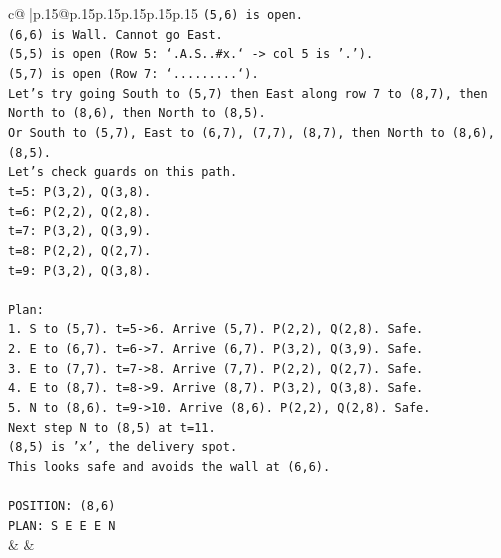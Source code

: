 \documentclass{article}
\begin{document}
{\begin{supertabular}{c@{$\;$}|p{.15\linewidth}@{}p{.15\linewidth}p{.15\linewidth}p{.15\linewidth}p{.15\linewidth}p{.15\linewidth}}
{{{\texttt{(5,6) is open.} \\
\texttt{(6,6) is Wall. Cannot go East.} \\
\texttt{(5,5) is open (Row 5: `.A.S..\#x.` {-}> col 5 is '.').} \\
\texttt{(5,7) is open (Row 7: `.........`).} \\
\texttt{Let's try going South to (5,7) then East along row 7 to (8,7), then North to (8,6), then North to (8,5).} \\
\texttt{Or South to (5,7), East to (6,7), (7,7), (8,7), then North to (8,6), (8,5).} \\
\texttt{Let's check guards on this path.} \\
\texttt{t=5: P(3,2), Q(3,8).} \\
\texttt{t=6: P(2,2), Q(2,8).} \\
\texttt{t=7: P(3,2), Q(3,9).} \\
\texttt{t=8: P(2,2), Q(2,7).} \\
\texttt{t=9: P(3,2), Q(3,8).} \\
\\ 
\texttt{Plan:} \\
\texttt{1. S to (5,7). t=5{-}>6. Arrive (5,7). P(2,2), Q(2,8). Safe.} \\
\texttt{2. E to (6,7). t=6{-}>7. Arrive (6,7). P(3,2), Q(3,9). Safe.} \\
\texttt{3. E to (7,7). t=7{-}>8. Arrive (7,7). P(2,2), Q(2,7). Safe.} \\
\texttt{4. E to (8,7). t=8{-}>9. Arrive (8,7). P(3,2), Q(3,8). Safe.} \\
\texttt{5. N to (8,6). t=9{-}>10. Arrive (8,6). P(2,2), Q(2,8). Safe.} \\
\texttt{Next step N to (8,5) at t=11.} \\
\texttt{(8,5) is 'x', the delivery spot.} \\
\texttt{This looks safe and avoids the wall at (6,6).} \\
\\ 
\texttt{POSITION: (8,6)} \\
\texttt{PLAN: S E E E N} \\
            }
        }
    }
    & & \\ \\


\end{supertabular}}
\end{document}
